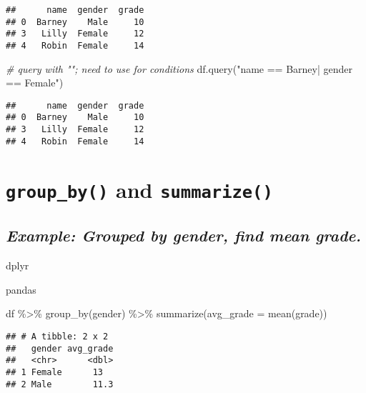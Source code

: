 \documentclass[
]{book}
\newenvironment{Shaded}{\begin{snugshade}}{\end{snugshade}}
\newcommand{\AttributeTok}[1]{\textcolor[rgb]{0.77,0.63,0.00}{#1}}
\newcommand{\CommentTok}[1]{\textcolor[rgb]{0.56,0.35,0.01}{\textit{#1}}}
\newcommand{\FunctionTok}[1]{\textcolor[rgb]{0.00,0.00,0.00}{#1}}
\newcommand{\NormalTok}[1]{#1}
\newcommand{\SpecialCharTok}[1]{\textcolor[rgb]{0.00,0.00,0.00}{#1}}
\newcommand{\StringTok}[1]{\textcolor[rgb]{0.31,0.60,0.02}{#1}}
\begin{document}
\begin{verbatim}
##      name  gender  grade
## 0  Barney    Male     10
## 3   Lilly  Female     12
## 4   Robin  Female     14
\end{verbatim}

\begin{Shaded}
\begin{Highlighting}[]
\CommentTok{\# query with ""; need to use \textquotesingle{}\textquotesingle{} for conditions}
\NormalTok{df.query(}\StringTok{"name == \textquotesingle{}Barney\textquotesingle{}| gender == \textquotesingle{}Female\textquotesingle{}"}\NormalTok{)}
\end{Highlighting}
\end{Shaded}

\begin{verbatim}
##      name  gender  grade
## 0  Barney    Male     10
## 3   Lilly  Female     12
## 4   Robin  Female     14
\end{verbatim}

\hypertarget{group_by-and-summarize}{%
\section{\texorpdfstring{\texttt{group\_by()} and \texttt{summarize()}}{group\_by() and summarize()}}\label{group_by-and-summarize}}

\hypertarget{example-grouped-by-gender-find-mean-grade.}{%
\subsection{\texorpdfstring{\emph{Example: Grouped by gender, find mean grade.}}{Example: Grouped by gender, find mean grade.}}\label{example-grouped-by-gender-find-mean-grade.}}

dplyr

pandas

\begin{Shaded}
\begin{Highlighting}[]
\NormalTok{df }\SpecialCharTok{\%\textgreater{}\%} 
  \FunctionTok{group\_by}\NormalTok{(gender) }\SpecialCharTok{\%\textgreater{}\%} 
  \FunctionTok{summarize}\NormalTok{(}\AttributeTok{avg\_grade =} \FunctionTok{mean}\NormalTok{(grade))}
\end{Highlighting}
\end{Shaded}

\begin{verbatim}
## # A tibble: 2 x 2
##   gender avg_grade
##   <chr>      <dbl>
## 1 Female      13  
## 2 Male        11.3
\end{verbatim}
\end{document}
